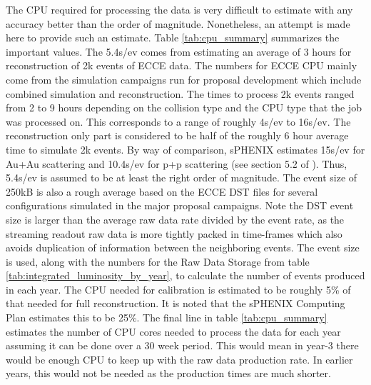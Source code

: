 The CPU required for processing the data is very difficult to estimate with any accuracy better than the order of magnitude. Nonetheless, an attempt is made here to provide such an estimate. Table \ref{tab:cpu_summary} summarizes the important values. The 5.4s/ev comes from estimating an average of 3 hours for reconstruction of 2k events of ECCE data. The numbers for ECCE CPU mainly come from the simulation campaigns run for proposal development which include combined simulation and reconstruction. The times to process 2k events ranged from 2 to 9 hours depending on the collision type and the CPU type that the job was processed on. This corresponds to a range of roughly 4s/ev to 16s/ev. The reconstruction only part is considered to be half of the roughly 6 hour average time to simulate 2k events. By way of comparison, sPHENIX estimates 15s/ev for Au+Au scattering and 10.4s/ev for p+p scattering (see section 5.2 of \cite{sphenix_computing_plan_2019}). Thus, 5.4s/ev is assumed to be at least the right order of magnitude. The event size of 250kB is also a rough average based on the ECCE DST files for several configurations simulated in the major proposal campaigns. Note the DST event size is larger than the average raw data rate divided by the event rate, as the streaming readout raw data is more tightly packed in time-frames which also avoids duplication of information between the neighboring events. The event size is used, along with the numbers for the Raw Data Storage from table \ref{tab:integrated_luminosity_by_year}, to calculate the number of events produced in each year. The CPU needed for calibration is estimated to be roughly 5\% of that needed for full reconstruction. It is noted that the sPHENIX Computing Plan estimates this to be 25\%. The final line in table \ref{tab:cpu_summary} estimates the number of CPU cores needed to process the data for each year assuming it can be done over a 30 week period. This would mean in year-3 there would be enough CPU to keep up with the raw data production rate. In earlier years, this would not be needed as the production times are much shorter.

